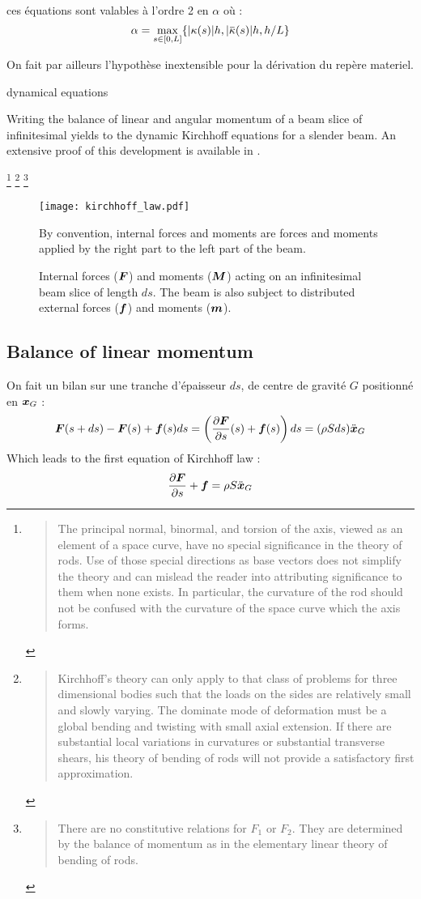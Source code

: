 ces équations sont valables à l'ordre 2 en $\alpha$ où :
\begin{equation}
	\alpha = \max_{s \in [0,L]} \{ \abs{\kappa(s)} h, \abs{\overbar{\kappa}(s)} h, h/L\}
\end{equation}

On fait par ailleurs l'hypothèse inextensible pour la dérivation du repère materiel.

dynamical equations

Writing the balance of linear and angular momentum of a beam slice of infinitesimal yields to the dynamic Kirchhoff equations for a slender beam. An extensive proof of this development is available in \cite{Dill1992}.

\footnote{\blockcquote[p.~5]{Dill1992}{The principal normal, binormal, and torsion of the axis, viewed as an element of a space curve, have no special significance in the theory of rods. Use of those special directions as base vectors does not simplify the theory and can mislead the reader into attributing significance to them when none exists. In particular, the curvature of the rod should not be confused with the curvature of the space curve which the axis forms.}}
\footnote{\blockcquote[p.~18]{Dill1992}{Kirchhoff's theory can only apply to that class of problems for three dimensional bodies such that the loads on the sides are relatively small and slowly varying. The dominate mode of deformation must be a global bending and twisting with small axial extension. If there are substantial local variations in curvatures or substantial transverse shears, his theory of bending of rods will not provide a satisfactory first approximation.}}
\footnote{\blockcquote[p.~15]{Dill1992}{There are no constitutive relations for $F_1$ or $F_2$. They are determined by the balance of momentum as in the elementary linear theory of bending of rods.}}

\begin{figure}[t]
	\centering
	\texttt{[image: kirchhoff\_law.pdf]}
	\caption{Internal forces ($\boldsymbol{F}$) and moments ($\boldsymbol{M}$) acting on an infinitesimal beam slice of length $ds$. The beam is also subject to distributed external forces ($\boldsymbol{f}$) and moments ($\boldsymbol{m}$).} By convention, internal forces and moments are forces and moments applied by the right part to the left part of the beam.
	\label{fig:5_0}
\end{figure}

\subsection{Balance of linear momentum}
On fait un bilan sur une tranche d'épaisseur $ds$, de centre de gravité $G$ positionné en $\boldsymbol{x}_G$ :
\begin{equation}
	\boldsymbol{F}(s+ds)-\boldsymbol{F}(s) + \boldsymbol{f}(s)ds = \left(\frac{\partial \boldsymbol{F}}{\partial s}(s)+\boldsymbol{f}(s)\right)ds = (\rho Sds)\ddot{\boldsymbol{x}}_G
\end{equation}
Which leads to the first equation of Kirchhoff law :
\begin{equation}
	\frac{\partial \boldsymbol{F}}{\partial s}+\boldsymbol{f} = \rho S \ddot{\boldsymbol{x}}_G
\end{equation}

